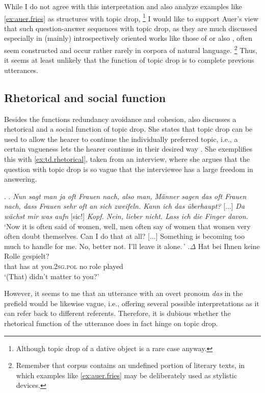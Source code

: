 While I do not agree with this interpretation and also analyze examples like \ref{ex:auer.fries} as structures with topic drop,%
\footnote{Although topic drop of a dative object is a rare case anyway.}
%
I would like to support Auer's view that such question-answer sequences with topic drop, as they are much discussed especially in (mainly) introspectively oriented works like those of \citet{fries1988} or also \citet{trutkowski2016}, often seem constructed and occur rather rarely in corpora of natural language.%
\footnote{Remember that  corpus  contains an undefined portion of literary texts, in which examples like \ref{ex:auer.fries} may be deliberately used as stylistic devices.}
%
Thus, it seems at least unlikely that the function of topic drop is to complete previous utterances.

\subsection{Rhetorical and social function}
Besides the functions redundancy avoidance and cohesion, \citet{helmer2016} also discusses a rhetorical and a social function of topic drop.
She states that topic drop can be used to allow the hearer to continue the individually preferred topic, i.e., a certain vagueness lets the hearer continue in their desired way \citep[174]{helmer2016}.
She exemplifies this with \ref{ex:td.rhetorical}, taken from an interview, where she argues that the question with topic drop is so vague that the interviewee has a large freedom in answering.

\ex.\label{ex:td.rhetorical}
\a. \textit{Nun sagt man ja oft Frauen nach, also man, Männer sagen das oft Frauen nach, dass Frauen sehr oft an sich zweifeln. Kann ich das überhaupt?} [...] \textit{Da wächst mir was aufn} [sic!] \textit{Kopf. Nein, lieber nicht. Lass ich die Finger davon.}\\
`Now it is often said of women, well, men often say of women that women very often doubt themselves. Can I do that at all? [...] Something is becoming too much to handle for me. No, better not. I'll leave it alone.\,'
\bg.$\Delta$ Hat bei Ihnen keine Rolle gespielt?\\
that has at you.\textsc{2sg.pol} no role played\\
`(That) didn't matter to you?' \citep[175, adapted]{helmer2016}

However, it seems to me that an utterance with an overt pronoun \textit{das} in the prefield would be likewise vague, i.e., offering several possible interpretations as it can refer back to different referents.
Therefore, it is dubious whether the rhetorical function of the utterance does in fact hinge on topic drop.

